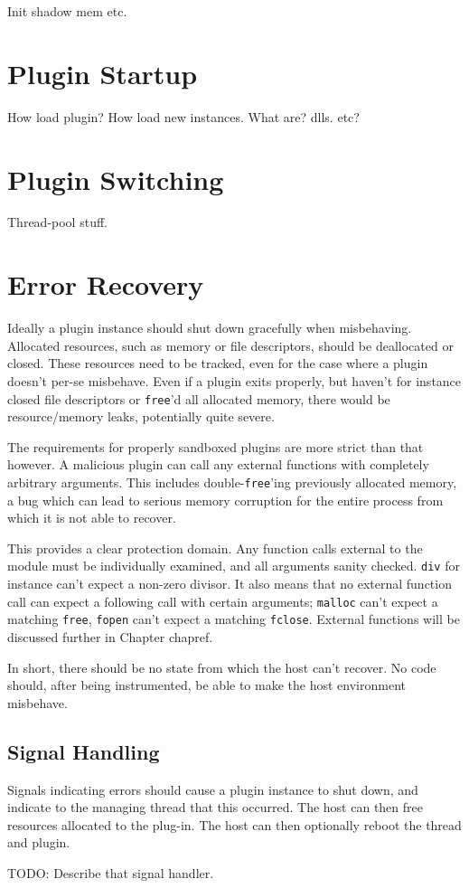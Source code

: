 Init shadow mem etc.


\section {Plugin Startup}

How load plugin? How load new instances. What are? dlls. etc?


\section {Plugin Switching}

Thread-pool stuff.


\section {Error Recovery}

Ideally a plugin instance should shut down gracefully when misbehaving.
Allocated resources, such as memory or file descriptors, should be deallocated
or closed. These resources need to be tracked, even for the case where a plugin
doesn't per-se misbehave. Even if a plugin exits properly, but haven't for
instance closed file descriptors or \texttt{free}'d all allocated memory, there
would be resource/memory leaks, potentially quite severe.

The requirements for properly sandboxed plugins are more strict than that
however. A malicious plugin can call any external functions with completely
arbitrary arguments. This includes double-\texttt{free}'ing previously
allocated memory, a bug which can lead to serious memory corruption for the
entire process from which it is not able to recover.

This provides a clear protection domain. Any function calls external to the
module must be individually examined, and all arguments sanity checked.
\texttt{div} for instance can't expect a non-zero divisor. It also means that
no external function call can expect a following call with certain arguments;
\texttt{malloc} can't expect a matching \texttt{free}, \texttt{fopen} can't
expect a matching \texttt{fclose}. External functions will be discussed further
in Chapter {chapref}. 

In short, there should be no state from which the host can't recover. No code
should, after being instrumented, be able to make the host environment
misbehave.

\subsection {Signal Handling}

Signals indicating errors should cause a plugin instance to shut down, and
indicate to the managing thread that this occurred. The host can then free
resources allocated to the plug-in. The host can then optionally reboot the
thread and plugin.

TODO: Describe that signal handler.
